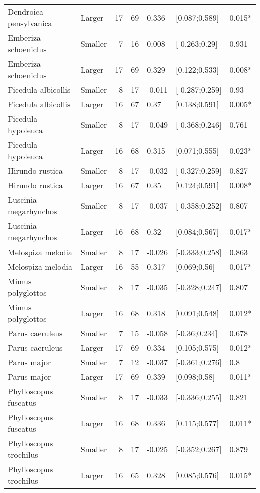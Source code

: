 \documentclass{article}
\begin{document}
\begin{table}[H]
\begin{tabular}{llrrlll}
  Dendroica pensylvanica & Larger & 17 & 69 & 0.336 & [0.087;0.589] & 0.015* \\ 
  Emberiza schoeniclus & Smaller & 7 & 16 & 0.008 & [-0.263;0.29] & 0.931 \\ 
  Emberiza schoeniclus & Larger & 17 & 69 & 0.329 & [0.122;0.533] & 0.008* \\ 
  Ficedula albicollis & Smaller & 8 & 17 & -0.011 & [-0.287;0.259] & 0.93 \\ 
  Ficedula albicollis & Larger & 16 & 67 & 0.37 & [0.138;0.591] & 0.005* \\ 
  Ficedula hypoleuca & Smaller & 8 & 17 & -0.049 & [-0.368;0.246] & 0.761 \\ 
  Ficedula hypoleuca & Larger & 16 & 68 & 0.315 & [0.071;0.555] & 0.023* \\ 
  Hirundo rustica & Smaller & 8 & 17 & -0.032 & [-0.327;0.259] & 0.827 \\ 
  Hirundo rustica & Larger & 16 & 67 & 0.35 & [0.124;0.591] & 0.008* \\ 
  Luscinia megarhynchos & Smaller & 8 & 17 & -0.037 & [-0.358;0.252] & 0.807 \\ 
  Luscinia megarhynchos & Larger & 16 & 68 & 0.32 & [0.084;0.567] & 0.017* \\ 
  Melospiza melodia & Smaller & 8 & 17 & -0.026 & [-0.333;0.258] & 0.863 \\ 
  Melospiza melodia & Larger & 16 & 55 & 0.317 & [0.069;0.56] & 0.017* \\ 
  Mimus polyglottos & Smaller & 8 & 17 & -0.035 & [-0.328;0.247] & 0.807 \\ 
  Mimus polyglottos & Larger & 16 & 68 & 0.318 & [0.091;0.548] & 0.012* \\ 
  Parus caeruleus & Smaller & 7 & 15 & -0.058 & [-0.36;0.234] & 0.678 \\ 
  Parus caeruleus & Larger & 17 & 69 & 0.334 & [0.105;0.575] & 0.012* \\ 
  Parus major & Smaller & 7 & 12 & -0.037 & [-0.361;0.276] & 0.8 \\ 
  Parus major & Larger & 17 & 69 & 0.339 & [0.098;0.58] & 0.011* \\ 
  Phylloscopus fuscatus & Smaller & 8 & 17 & -0.033 & [-0.336;0.255] & 0.821 \\ 
  Phylloscopus fuscatus & Larger & 16 & 68 & 0.336 & [0.115;0.577] & 0.011* \\ 
  Phylloscopus trochilus & Smaller & 8 & 17 & -0.025 & [-0.352;0.267] & 0.879 \\ 
  Phylloscopus trochilus & Larger & 16 & 65 & 0.328 & [0.085;0.576] & 0.015* \\ 

\end{tabular}
\end{table}
\end{document}
